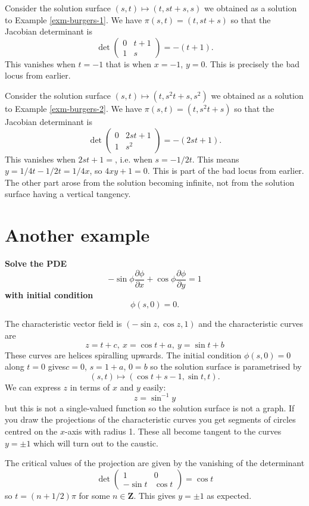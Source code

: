 \begin{exm}
Consider the solution surface $(s,t)\mapsto (t,st+s,s)$ we obtained as a solution to Example \ref{exm-burgers-1}. We have $\pi(s,t)=(t,st+s)$ so that the Jacobian determinant is
\[\det\left(\begin{array}{cc}0 & t+1\\ 1 & s\end{array}\right)=-(t+1).\]
This vanishes when $t=-1$ that is when $x=-1$, $y=0$. This is precisely the bad locus from earlier.
\end{exm}
\begin{exm}
Consider the solution surface $(s,t)\mapsto (t,s^2t+s,s^2)$ we obtained as a solution to Example \ref{exm-burgers-2}. We have $\pi(s,t)=(t,s^2t+s)$ so that the Jacobian determinant is
\[\det\left(\begin{array}{cc}0 & 2st+1\\ 1 & s^2\end{array}\right)=-(2st+1).\]
This vanishes when $2st+1=$, i.e. when $s=-1/2t$. This means $y=1/4t-1/2t=1/4x$, so $4xy+1=0$. This is part of the bad locus from earlier. The other part arose from the solution becoming infinite, not from the solution surface having a vertical tangency.
\end{exm}

\section{Another example}

\begin{exm}
{\bf Solve the PDE
\[-\sin\phi\frac{\partial\phi}{\partial x}+\cos\phi\frac{\partial\phi}{\partial y}=1\]
with initial condition
\[\phi(s,0)=0.\]}

The characteristic vector field is $(-\sin z,\cos z,1)$ and the characteristic curves are
\[z=t+c,\ x=\cos t+a,\ y=\sin t+b\]
These curves are helices spiralling upwards. The initial condition $\phi(s,0)=0$ along $t=0$ gives$c=0$, $s=1+a$, $0=b$ so the solution surface is parametrised by
\[(s,t)\mapsto (\cos t+s-1,\sin t,t).\]
We can express $z$ in terms of $x$ and $y$ easily:
\[z=\sin^{-1}y\]
but this is not a single-valued function so the solution surface is not a graph. If you draw the projections of the characteristic curves you get segments of circles centred on the $x$-axis with radius 1. These all become tangent to the curves $y=\pm 1$ which will turn out to the caustic.

The critical values of the projection are given by the vanishing of the determinant
\[\det\left(\begin{array}{cc}1 & 0\\-\sin t & \cos t\end{array}\right)=\cos t\]
so $t=(n+1/2)\pi$ for some $n\in\mathbf{Z}$. This gives $y=\pm 1$ as expected.
\end{exm}

